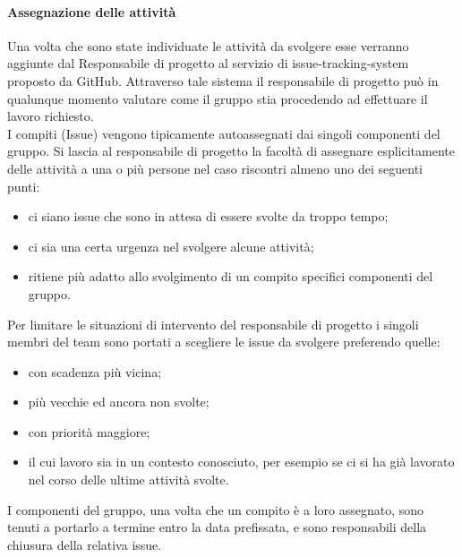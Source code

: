 \paragraph{Assegnazione delle attività}
Una volta che sono state individuate le attività da svolgere esse verranno aggiunte dal Responsabile di progetto al servizio di issue-tracking-system proposto da GitHub.
Attraverso tale sistema il responsabile di progetto può in qualunque momento valutare come il gruppo stia procedendo ad effettuare il lavoro richiesto.\\
I compiti (Issue) vengono tipicamente autoassegnati dai singoli componenti del gruppo. Si lascia al responsabile di progetto la facoltà di assegnare esplicitamente delle attività a una o più persone nel caso riscontri almeno uno dei seguenti punti:
\begin{itemize}
    \item ci siano issue che sono in attesa di essere svolte da troppo tempo;
    \item ci sia una certa urgenza nel svolgere alcune attività;
    \item ritiene più adatto allo svolgimento di un compito specifici componenti del gruppo.
\end{itemize}
Per limitare le situazioni di intervento del responsabile di progetto i singoli membri del team sono portati a scegliere le issue da svolgere preferendo quelle:
\begin{itemize}
    \item con scadenza più vicina;
    \item più vecchie ed ancora non svolte;
    \item con priorità maggiore;
    \item il cui lavoro sia in un contesto conosciuto, per esempio se ci si ha già lavorato nel corso delle ultime attività svolte.
\end{itemize}
I componenti del gruppo, una volta che un compito è a loro assegnato, sono tenuti a portarlo a termine entro la data prefissata, e sono responsabili della chiusura della relativa issue.

